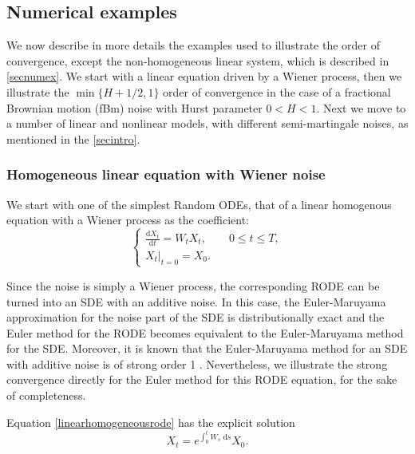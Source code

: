 \documentclass[reqno,12pt]{amsart}
\theoremstyle{plain} %
\theoremstyle{definition} %
\begin{document}
\subsection{Numerical examples}
\label{secnumericalexamples}

We now describe in more details the examples used to illustrate the order of convergence, except the non-homogeneous linear system, which is described in \cref{secnumex}. We start with a linear equation driven by a Wiener process, then we illustrate the $\min\{H + 1/2, 1\}$ order of convergence in the case of a fractional Brownian motion (fBm) noise with Hurst parameter $0 < H < 1.$ Next we move to a number of linear and nonlinear models, with different semi-martingale noises, as mentioned in the \cref{secintro}.

\subsubsection{Homogeneous linear equation with Wiener noise}
\label{seclinearhomogeneousrode}

We start with one of the simplest Random ODEs, that of a linear homogenous equation with a Wiener process as the coefficient:
\begin{equation}
    \label{linearhomogeneousrode}
    \begin{cases}
        \displaystyle \frac{\mathrm{d}X_t}{\mathrm{d} t} = W_t X_t, \qquad 0 \leq t \leq T, \\
        \left. X_t \right|_{t = 0} = X_0.
      \end{cases}
\end{equation}

Since the noise is simply a Wiener process, the corresponding RODE can be turned into an SDE with an additive noise. In this case, the Euler-Maruyama approximation for the noise part of the SDE is distributionally exact and the Euler method for the RODE becomes equivalent to the Euler-Maruyama method for the SDE. Moreover, it is known that the Euler-Maruyama method for an SDE with additive noise is of strong order 1 \cite{HighamKloeden2021}. Nevertheless, we illustrate the strong convergence directly for the Euler method for this RODE equation, for the sake of completeness.

Equation \cref{linearhomogeneousrode} has the explicit solution
\begin{equation}
    \label{Xtlinearhomogeneousrodesolution}
    X_t = e^{\int_0^t W_s \;\mathrm{d}s}X_0.
\end{equation}
\end{document}

